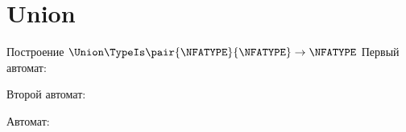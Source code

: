 \section{Union}
\begin{frame}{Построение $\Union\TypeIs\pair{\NFATYPE}{\NFATYPE}\to\NFATYPE$}
	Первый автомат:


	Второй автомат:


	Автомат:


\end{frame}
